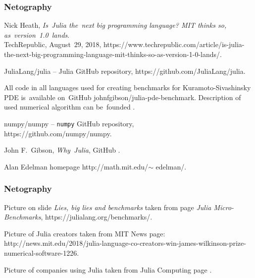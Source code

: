 \documentclass[10pt,t]{beamer}
\begin{document}
\begin{frame}
  \frametitle{Netography}


  Nick Heath, \textit{Is~Julia the~next big programming
    language? MIT thinks so, as~version~1.0~lands}. \\
  TechRepublic, August~29, 2018,
  {https://www.techrepublic.com/article/is-julia-the-next-big-programming-language-mit-thinks-so-as-version-1-0-lands/}.

  JuliaLang/julia -- Julia GitHub repository,
  {https://github.com/JuliaLang/julia}.

  All code in all languages used for creating benchmarks for
  Kuramoto-Sivashinsky PDE is~available on~GitHub
  {johnfgibson/julia-pde-benchmark}.
  Description of used numerical algorithm can be~founded
  .

  numpy/numpy -- \texttt{numpy} GitHub repository, \\
  {https://github.com/numpy/numpy}.

  John F.~Gibson, \textit{Why~Julia}, GitHub
  .

  Alan Edelman homepage
  {http://math.mit.edu/$\sim$ edelman/}.

\end{frame}





\begin{frame}
  \frametitle{Netography}


  Picture on slide \textit{Lies, big lies and benchmarks} taken from
  page \textit{Julia Micro-Benchmarks},
  {https://julialang.org/benchmarks/}.

  Picture of Julia creators taken from MIT News page: 
  {http://news.mit.edu/2018/julia-language-co-creators-win-james-wilkinson-prize-numerical-software-1226}.

  Picture of companies using Julia taken from Julia Computing page
  .

\end{frame}
\end{document}
